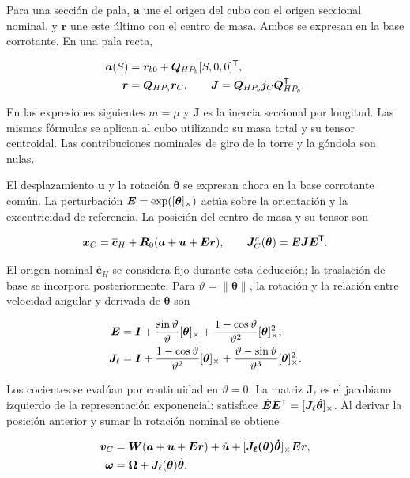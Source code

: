 Para una sección de pala, $\bm a$ une el origen del cubo con el origen seccional nominal, y $\bm r$ une este último con el centro de masa. Ambos se expresan en la base corrotante. En una pala recta,

\begin{align}
\bm a(S)&=\bm r_{b0}+\bm Q_{HP_b}[S,0,0]^\mathsf T,\nonumber\\
\bm r&=\bm Q_{HP_b}\bm r_C,\qquad
\bm J=\bm Q_{HP_b}\bm j_C\bm Q_{HP_b}^\mathsf T.
\label{eq:datos-giro}
\end{align}

En las expresiones siguientes $m=\mu$ y $\bm J$ es la inercia seccional por longitud. Las mismas fórmulas se aplican al cubo utilizando su masa total y su tensor centroidal. Las contribuciones nominales de giro de la torre y la góndola son nulas.

El desplazamiento $\bm u$ y la rotación $\bm\theta$ se expresan ahora en la base corrotante común. La perturbación $\bm E=\exp([\bm{\theta}]_\times)$ actúa sobre la orientación y la excentricidad de referencia. La posición del centro de masa y su tensor son

\begin{equation}
\bm x_C=\overline{\bm c}_H+\bm R_0(\bm a+\bm u+\bm E\bm r),\qquad
\bm J_C^{c}(\bm\theta)=\bm E\bm J\bm E^\mathsf T.
\end{equation}

El origen nominal $\overline{\bm c}_H$ se considera fijo durante esta deducción; la traslación de base se incorpora posteriormente. Para $\vartheta=\|\bm\theta\|$, la rotación y la relación entre velocidad angular y derivada de $\bm\theta$ son

\begin{align}
\bm E&=\bm I+\frac{\sin\vartheta}{\vartheta}[\bm{\theta}]_\times
+\frac{1-\cos\vartheta}{\vartheta^2}[\bm{\theta}]_\times^2,\nonumber\\
\bm J_\ell&=\bm I+\frac{1-\cos\vartheta}{\vartheta^2}[\bm{\theta}]_\times
+\frac{\vartheta-\sin\vartheta}{\vartheta^3}[\bm{\theta}]_\times^2.
\label{eq:jacobiano}
\end{align}

Los cocientes se evalúan por continuidad en $\vartheta=0$. La matriz $\bm J_\ell$ es el jacobiano izquierdo de la representación exponencial: satisface $\dot{\bm E}\bm E^\mathsf T=[\bm J_\ell\dot{\bm\theta}]_\times$. Al derivar la posición anterior y sumar la rotación nominal se obtiene

\begin{align}
\bm v_C&=\bm W(\bm a+\bm u+\bm E\bm r)+\dot{\bm u}
+[\bm{J_\ell(\bm\theta)\dot{\bm\theta}}]_\times\bm E\bm r,\nonumber\\
\bm\omega&=\bm\Omega+\bm J_\ell(\bm\theta)\dot{\bm\theta}.
\label{eq:exactvelocity}
\end{align}

